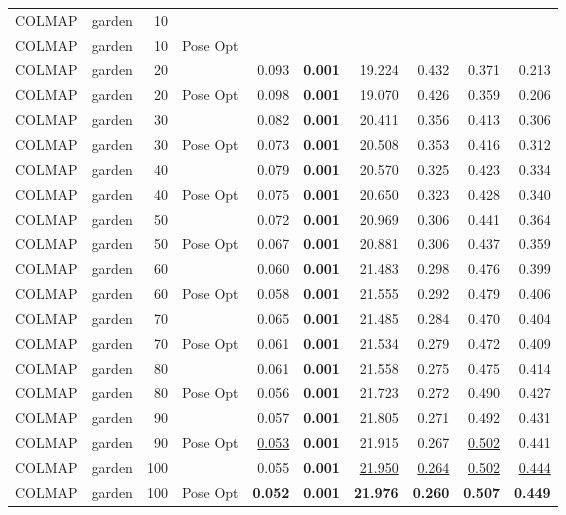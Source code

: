 \begin{table}[H]
\begin{tabular}{llrlrrrrrr}
\midrule
COLMAP & garden & 10 &  &  &  &  &  &  &  \\
COLMAP & garden & 10 & Pose Opt &  &  &  &  &  &  \\
COLMAP & garden & 20 &  & 0.093 & \textbf{0.001} & 19.224 & 0.432 & 0.371 & 0.213 \\
COLMAP & garden & 20 & Pose Opt & 0.098 & \textbf{0.001} & 19.070 & 0.426 & 0.359 & 0.206 \\
COLMAP & garden & 30 &  & 0.082 & \textbf{0.001} & 20.411 & 0.356 & 0.413 & 0.306 \\
COLMAP & garden & 30 & Pose Opt & 0.073 & \textbf{0.001} & 20.508 & 0.353 & 0.416 & 0.312 \\
COLMAP & garden & 40 &  & 0.079 & \textbf{0.001} & 20.570 & 0.325 & 0.423 & 0.334 \\
COLMAP & garden & 40 & Pose Opt & 0.075 & \textbf{0.001} & 20.650 & 0.323 & 0.428 & 0.340 \\
COLMAP & garden & 50 &  & 0.072 & \textbf{0.001} & 20.969 & 0.306 & 0.441 & 0.364 \\
COLMAP & garden & 50 & Pose Opt & 0.067 & \textbf{0.001} & 20.881 & 0.306 & 0.437 & 0.359 \\
COLMAP & garden & 60 &  & 0.060 & \textbf{0.001} & 21.483 & 0.298 & 0.476 & 0.399 \\
COLMAP & garden & 60 & Pose Opt & 0.058 & \textbf{0.001} & 21.555 & 0.292 & 0.479 & 0.406 \\
COLMAP & garden & 70 &  & 0.065 & \textbf{0.001} & 21.485 & 0.284 & 0.470 & 0.404 \\
COLMAP & garden & 70 & Pose Opt & 0.061 & \textbf{0.001} & 21.534 & 0.279 & 0.472 & 0.409 \\
COLMAP & garden & 80 &  & 0.061 & \textbf{0.001} & 21.558 & 0.275 & 0.475 & 0.414 \\
COLMAP & garden & 80 & Pose Opt & 0.056 & \textbf{0.001} & 21.723 & 0.272 & 0.490 & 0.427 \\
COLMAP & garden & 90 &  & 0.057 & \textbf{0.001} & 21.805 & 0.271 & 0.492 & 0.431 \\
COLMAP & garden & 90 & Pose Opt & \underline{0.053} & \textbf{0.001} & 21.915 & 0.267 & \underline{0.502} & 0.441 \\
COLMAP & garden & 100 &  & 0.055 & \textbf{0.001} & \underline{21.950} & \underline{0.264} & \underline{0.502} & \underline{0.444} \\
COLMAP & garden & 100 & Pose Opt & \textbf{0.052} & \textbf{0.001} & \textbf{21.976} & \textbf{0.260} & \textbf{0.507} & \textbf{0.449} \\

\end{tabular}
\end{table}
